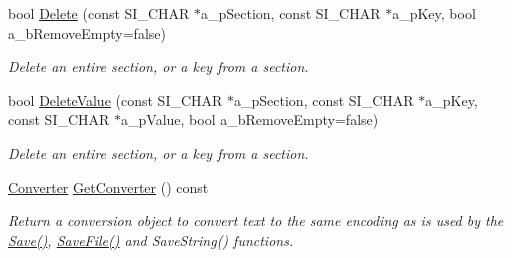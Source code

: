 \begin{DoxyCompactItemize}
bool \hyperlink{class_c_simple_ini_templ_aa5c1cdd0b306434d9e9f1422888049da}{Delete} (const S\+I\+\_\+\+C\+H\+AR $\ast$a\+\_\+p\+Section, const S\+I\+\_\+\+C\+H\+AR $\ast$a\+\_\+p\+Key, bool a\+\_\+b\+Remove\+Empty=false)
\begin{DoxyCompactList}\small\item\em Delete an entire section, or a key from a section. \end{DoxyCompactList}\item 
bool \hyperlink{class_c_simple_ini_templ_a04551ae6c3e92475b2a823d2729652d6}{Delete\+Value} (const S\+I\+\_\+\+C\+H\+AR $\ast$a\+\_\+p\+Section, const S\+I\+\_\+\+C\+H\+AR $\ast$a\+\_\+p\+Key, const S\+I\+\_\+\+C\+H\+AR $\ast$a\+\_\+p\+Value, bool a\+\_\+b\+Remove\+Empty=false)
\begin{DoxyCompactList}\small\item\em Delete an entire section, or a key from a section. \end{DoxyCompactList}\item 
\hyperlink{class_c_simple_ini_templ_1_1_converter}{Converter} \hyperlink{class_c_simple_ini_templ_a98442d01db35187f2770f0a91042cce8}{Get\+Converter} () const 
\begin{DoxyCompactList}\small\item\em Return a conversion object to convert text to the same encoding as is used by the \hyperlink{class_c_simple_ini_templ_a5fea5d590edbb5eef694991c7c355915}{Save()}, \hyperlink{class_c_simple_ini_templ_a1449e083d968790ef7479de24edddba0}{Save\+File()} and Save\+String() functions. \end{DoxyCompactList}\end{DoxyCompactItemize}
